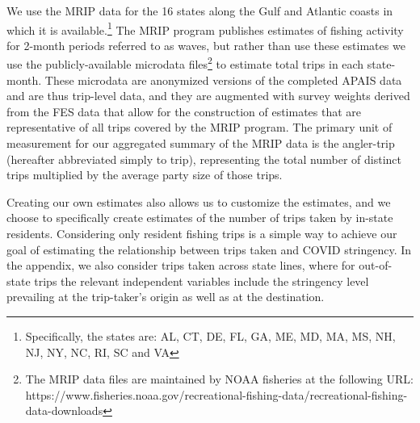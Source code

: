 \documentclass[12pt]{article}
\begin{document}
We use the MRIP data for the 16 states along the Gulf and Atlantic
coasts in which it is available.\footnote{Specifically, the states are:
  AL, CT, DE, FL, GA, ME, MD, MA, MS, NH, NJ, NY, NC, RI, SC and VA} The
MRIP program publishes estimates of fishing activity for 2-month periods
referred to as waves, but rather than use these estimates we use the
publicly-available microdata files\footnote{The MRIP data files are
  maintained by NOAA fisheries at the following URL:
  https://www.fisheries.noaa.gov/recreational-fishing-data/recreational-fishing-data-downloads}
to estimate total trips in each state-month. These microdata are
anonymized versions of the completed APAIS data and are thus trip-level
data, and they are augmented with survey weights derived from the FES
data that allow for the construction of estimates that are
representative of all trips covered by the MRIP program. The primary
unit of measurement for our aggregated summary of the MRIP data is the
angler-trip (hereafter abbreviated simply to trip), representing the
total number of distinct trips multiplied by the average party size of
those trips.

Creating our own estimates also allows us to customize the estimates,
and we choose to specifically create estimates of the number of trips
taken by in-state residents. Considering only resident fishing trips is
a simple way to achieve our goal of estimating the relationship between
trips taken and COVID stringency. In the appendix, we also consider
trips taken across state lines, where for out-of-state trips the
relevant independent variables include the stringency level prevailing
at the trip-taker's origin as well as at the destination.
\end{document}
